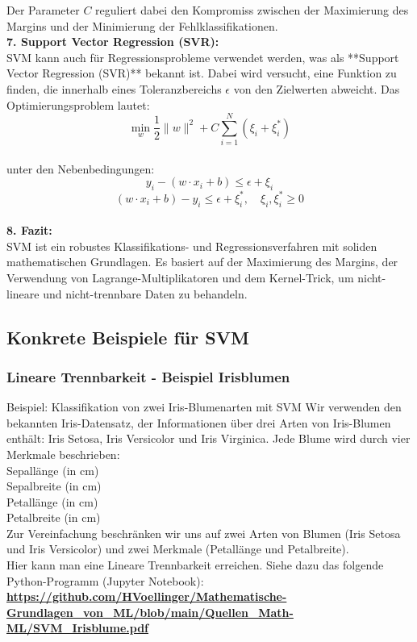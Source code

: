 \documentclass[12pt]{article}
\begin{document}
%
Der Parameter \(C\) reguliert dabei den Kompromiss zwischen der Maximierung des Margins und der Minimierung der Fehlklassifikationen.\\[0.3cm]
%
\textbf{7. Support Vector Regression (SVR):}\\
SVM kann auch für Regressionsprobleme verwendet werden, was als **Support Vector Regression (SVR)** bekannt ist. Dabei wird versucht, eine Funktion zu finden, die innerhalb eines Toleranzbereichs \(\epsilon\) von den Zielwerten abweicht. Das Optimierungsproblem lautet:\\
\[
\min_w \frac{1}{2} \|w\|^2 + C \sum_{i=1}^N (\xi_i + \xi_i^*)
\]\\
unter den Nebenbedingungen:
\[
y_i - (w \cdot x_i + b) \leq \epsilon + \xi_i
\]
\[
(w \cdot x_i + b) - y_i \leq \epsilon + \xi_i^*, \quad \xi_i, \xi_i^* \geq 0
\]\\
%
\textbf{8. Fazit:}\\
SVM ist ein robustes Klassifikations- und Regressionsverfahren mit soliden mathematischen Grundlagen. Es basiert auf der Maximierung des Margins, der Verwendung von Lagrange-Multiplikatoren und dem Kernel-Trick, um nicht-lineare und nicht-trennbare Daten zu behandeln.
%
\subsection{Konkrete Beispiele für SVM}
%

\subsubsection{Lineare Trennbarkeit - Beispiel Irisblumen}
%
Beispiel: Klassifikation von zwei Iris-Blumenarten mit SVM
Wir verwenden den bekannten Iris-Datensatz, der Informationen über drei Arten von Iris-Blumen enthält: Iris Setosa, Iris Versicolor und Iris Virginica. Jede Blume wird durch vier Merkmale beschrieben:\\
%
Sepallänge (in cm)\\
Sepalbreite (in cm)\\
Petallänge (in cm)\\
Petalbreite (in cm)\\[0.2cm]
%
Zur Vereinfachung beschränken wir uns auf zwei Arten von Blumen (Iris Setosa und Iris Versicolor) und zwei Merkmale (Petallänge und Petalbreite).\\
Hier kann man eine Lineare Trennbarkeit erreichen. Siehe dazu das folgende Python-Programm (Jupyter Notebook):\\[0.2cm]
\textbf{\url{https://github.com/HVoellinger/Mathematische-Grundlagen_von_ML/blob/main/Quellen_Math-ML/SVM_Irisblume.pdf}} 
%
\end{document}
